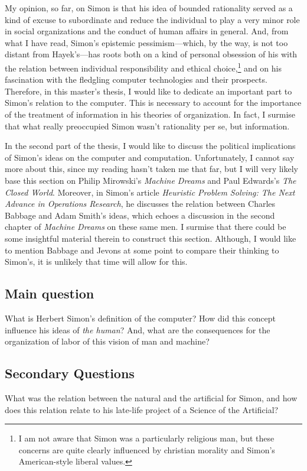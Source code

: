 \documentclass[paper=A4,portrait,twoside=true,twocolumn=true,headinclude=false,footinclude=false,fontsize=10,BCOR=15mm,DIV=13,pagesize=auto,titlepage=firstiscover,mpinclude=true,headings=twolinechapter,open=right,chapterprefix=false,numbers=noendperiod,headsepline=false,parskip=false]{scrbook}
\theoremstyle{definition}
\begin{document}
My opinion, so far, on Simon is that his idea of bounded rationality served
as a kind of excuse to subordinate and reduce the individual to play a very
minor role in social organizations and the conduct of human affairs in
general. And, from what I have read, Simon's epistemic pessimism---which,
by the way, is not too distant from Hayek's---has roots both on a kind of
personal obsession of his with the relation between individual
responsibility and ethical choice,\footnote{I am not aware that Simon was a particularly religious man, but these
concerns are quite clearly influenced by christian morality and Simon's
American-style liberal values.} and on his fascination with the
fledgling computer technologies and their prospects. Therefore, in this
master's thesis, I would like to dedicate an important part to Simon's
relation to the computer. This is necessary to account for the importance
of the treatment of information in his theories of organization. In
fact, I surmise that what really preoccupied Simon wasn't 
rationality per se, but information.

In the second part of the thesis, I would like to discuss the political
implications of Simon's ideas on the computer and
computation. Unfortunately, I cannot say more about this, since my reading
hasn't taken me that far, but I will very likely base this section on
Philip Mirowski's \emph{Machine Dreams} and Paul Edwards's \emph{The Closed
World}. Moreover, in Simon's article \emph{Heuristic Problem Solving: The Next
Advance in Operations Research}, he discusses the relation between Charles
Babbage and Adam Smith's ideas, which echoes a discussion in the second
chapter of \emph{Machine Dreams} on these same men. I surmise that there could be
some insightful material therein to construct this section. Although, I
would like to mention Babbage and Jevons at some point to compare their
thinking to Simon's, it is unlikely that time will allow for this.
\subsection{Main question}
\label{sec:orged090cf}
What is Herbert Simon's definition of the computer? How did this concept
influence his ideas of \emph{the human}? And, what are the consequences for the
organization of labor of this vision of man and machine?
\subsection{Secondary Questions}
\label{sec:org0127caf}
What was the relation between the natural and the artificial for Simon, and
how does this relation relate to his late-life project of a Science of
the Artificial?
\end{document}

